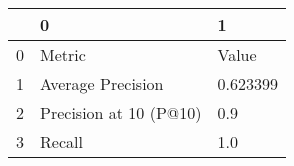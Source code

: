 \begin{tabular}{lll}
\toprule
{} &                       0 &         1 \\
\midrule
0 &                  Metric &     Value \\
1 &       Average Precision &  0.623399 \\
2 &  Precision at 10 (P@10) &       0.9 \\
3 &                  Recall &       1.0 \\
\bottomrule
\end{tabular}
